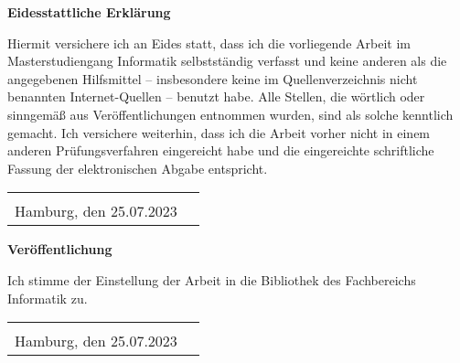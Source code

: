 
\thispagestyle{empty}
\pagestyle{empty}

\begin{center}
	\Large
	\textbf{Eidesstattliche Erklärung}
\end{center}
\noindent
Hiermit versichere ich an Eides statt, dass ich die vorliegende Arbeit im Masterstudiengang Informatik selbstständig verfasst und keine anderen als die angegebenen Hilfsmittel -- insbesondere keine im Quellenverzeichnis nicht benannten Internet-Quellen -- benutzt habe. Alle Stellen, die wörtlich oder sinngemäß aus Veröffentlichungen entnommen wurden, sind als solche kenntlich gemacht. Ich versichere weiterhin, dass ich die Arbeit vorher nicht in einem anderen Prüfungsverfahren eingereicht habe und die eingereichte schriftliche Fassung der elektronischen Abgabe entspricht.

\vspace*{1cm}
\noindent
\begin{tabularx}{\textwidth}{@{}Xr@{}}
	&
	\begin{tabular}{@{}l@{}}
		\makebox[5cm]{}\\ %
		\hline
	\end{tabular}
	\\
	\noindent
	Hamburg, den 25.07.2023
	&
	\makebox[5cm]{Hauke Stieler}
\end{tabularx}

\vspace*{3cm}

\begin{center}
	\Large
	\textbf{Veröffentlichung}
\end{center}
\noindent
Ich stimme der Einstellung der Arbeit in die Bibliothek des Fachbereichs Informatik zu.

\vspace*{1cm}
\noindent
\begin{tabularx}{\textwidth}{@{}Xr@{}}
	&
	\begin{tabular}{@{}l@{}}
		\makebox[5cm]{}\\ %
		\hline
	\end{tabular}
	\\
	\noindent
	Hamburg, den 25.07.2023
	&
	\makebox[5cm]{Hauke Stieler}
\end{tabularx}